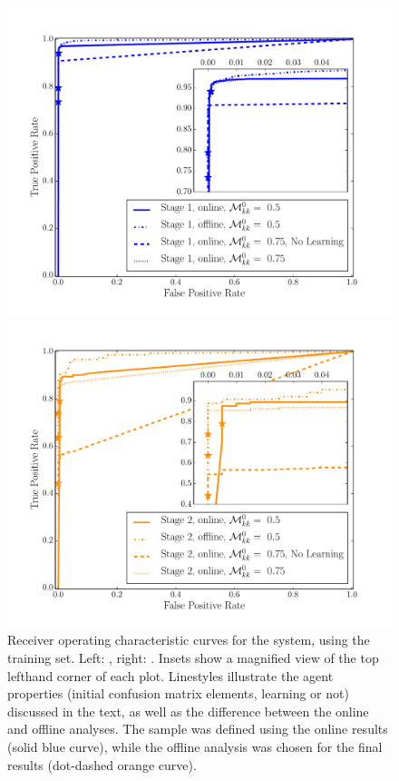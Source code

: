 \documentclass[useAMS,usenatbib,a4paper]{mn2e}
\begin{document}
\begin{figure}
\begin{minipage}{0.48\linewidth}
  \centering\includegraphics[width=\linewidth]{stage1_ROC.pdf}
\end{minipage}\hfill
\begin{minipage}{0.48\linewidth}
  \centering\includegraphics[width=\linewidth]{stage2_ROC.pdf}
\end{minipage}
\caption{Receiver operating characteristic curves for the \SW system, using
the \cfhtls training set. Left: \StageOne, right: \StageTwo. Insets show a
magnified view of the top lefthand corner of each plot. Linestyles illustrate
the agent properties (initial confusion matrix elements, learning or not)
discussed in the text, as well as the difference between the online and offline
analyses. The \StageTwo sample was defined using the online \StageOne results
(solid blue curve), while the offline analysis was chosen for the final
\StageTwo results (dot-dashed orange curve). }
\label{fig:results:sample:roc}
\end{figure}
\end{document}
